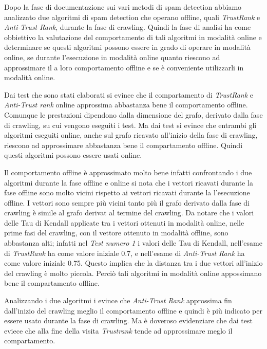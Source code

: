 Dopo la fase di documentazione sui vari metodi di spam detection abbiamo analizzato due algoritmi di spam detection che operano offline, quali \textit{TrustRank} e \textit{Anti-Trust Rank}, durante la fase di crawling. Quindi la fase di analisi ha come obbiettivo la valutazione del comportamento di tali algoritmi in modalità online e determinare se  questi algoritmi possono essere in grado di operare in modalità online, se durante l’esecuzione in modalità online quanto riescono ad approssimare il
a loro comportamento offline e se è conveniente utilizzarli in modalità online.

Dai test che sono stati elaborati si evince che il compartamento di \textit{TrustRank} e \textit{Anti-Trust rank} online approssima abbastanza bene il comportamento offline. Comunque le prestazioni dipendono dalla dimensione del grafo, derivato dalla fase di crawling, su cui vengono eseguiti i test. Ma dai test si evince che entrambi gli algoritmi eseguiti online, anche sul grafo ricavato all'inizio della fase di crawling, riescono ad approssimare abbastanza bene il compartamento offline. Quindi questi algoritmi possono essere usati online.

Il comportamento offline è approssimato molto bene infatti confrontando i due algoritmi durante la fase offline e online si nota che i vettori ricavati durante la fase offline sono molto vicini rispetto ai vettori ricavati durante la l'esecuzione offline. I vettori sono sempre più vicini tanto più il grafo derivato dalla fase di crawling è simile al grafo derivat al termine del crawling. Da notare che i valori delle Tau di Kendall applicate tra i vettori ottenuti in modalità online, nelle prime fasi del crawling, con il vettore ottenuto in modalità offline, sono abbastanza alti; infatti nel \textit{Test numero 1} i valori delle Tau di Kendall,  nell'esame di \textit{TrustRank} ha come valore iniziale 0.7, e nell'esame di \textit{Anti-Trust Rank} ha come valore iniziale 0.75. Questo implica che la distanza tra i due vettori all'inizio del crawling è molto piccola. Perciò tali algoritmi in modalità online appossimano bene il compartamento offline.

Analizzando i due algoritmi i evince che \textit{Anti-Trust Rank} approssima fin dall'inizio del crawling meglio il comportamento offline e quindi è più indicato per essere usato durante la fase di crawling. Ma è doveroso evidenziare che dai test eviece che alla fine della visita \textit{Trustrank} tende ad approssimare meglo il compartamento.


